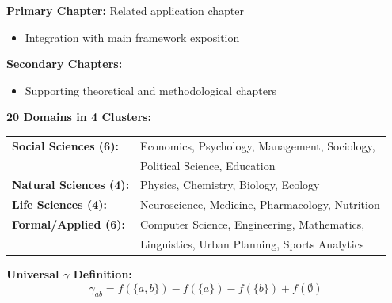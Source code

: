 \begin{tcolorbox}[colback=purple!5!white, colframe=purple!75!black,
    title=Chapter Linkage]

\textbf{Primary Chapter:} Related application chapter
\begin{itemize}[nosep]
\item Integration with main framework exposition
\end{itemize}

\textbf{Secondary Chapters:}
\begin{itemize}[nosep]
\item Supporting theoretical and methodological chapters
\end{itemize}

\end{tcolorbox}

\begin{tcolorbox}[colback=blue!5!white,colframe=blue!75!black,title=\textbf{Quick Reference: Domain Clusters}]

\textbf{20 Domains in 4 Clusters:}

\begin{tabular}{@{}ll@{}}
\textbf{Social Sciences (6):} & Economics, Psychology, Management, Sociology, \\
& Political Science, Education \\
\textbf{Natural Sciences (4):} & Physics, Chemistry, Biology, Ecology \\
\textbf{Life Sciences (4):} & Neuroscience, Medicine, Pharmacology, Nutrition \\
\textbf{Formal/Applied (6):} & Computer Science, Engineering, Mathematics, \\
& Linguistics, Urban Planning, Sports Analytics \\
\end{tabular}

\textbf{Universal $\gamma$ Definition:}
\begin{equation}
\gamma_{ab} = f(\{a,b\}) - f(\{a\}) - f(\{b\}) + f(\emptyset)
\end{equation}

\end{tcolorbox}

